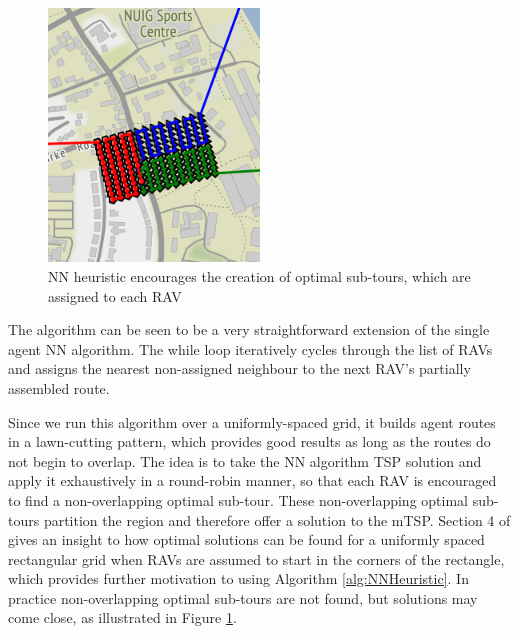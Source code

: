 \begin{figure}[h]
\centering
\includegraphics[width=0.5\textwidth]{Chapters/MultiAgentCoverage/Figs/RAVRoutingNUIGCropped.png}
\caption{NN heuristic encourages the creation of optimal sub-tours, which are assigned to each RAV}
\label{fig:NNPartitioning}
\end{figure}

The algorithm can be seen to be a very straightforward extension of the single agent NN algorithm. The while loop iteratively cycles through the list of RAVs and assigns the nearest non-assigned neighbour to the next RAV's partially assembled route.

Since we run this algorithm over a uniformly-spaced grid, it builds agent routes in a lawn-cutting pattern, which provides good results as long as the routes do not begin to overlap. The idea is to take the NN algorithm TSP solution and apply it exhaustively in a round-robin manner, so that each RAV is encouraged to find a non-overlapping optimal sub-tour. These non-overlapping optimal sub-tours partition the region and therefore offer a solution to the mTSP. Section 4 of \cite{Hungerlander2018TheGrids} gives an insight to how optimal solutions can be found for a uniformly spaced rectangular grid when RAVs are assumed to start in the corners of the rectangle, which provides further motivation to using Algorithm \ref{alg:NNHeuristic}. In practice non-overlapping optimal sub-tours are not found, but solutions may come close, as illustrated in Figure \ref{fig:NNPartitioning}.


